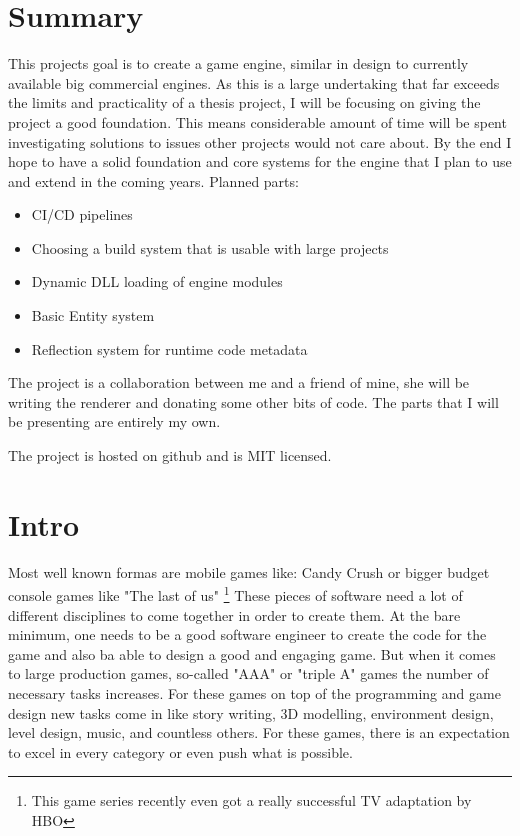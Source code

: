 \chapter{Summary}

This projects goal is to create a game engine, similar in design to currently available big commercial engines.
As this is a large undertaking that far exceeds the limits and practicality of a thesis project, I will be focusing on giving the project a good foundation. This means considerable amount of time will be spent investigating solutions to issues other projects would not care about. By the end I hope to have a solid foundation and core systems for the engine that I plan to use and extend in the coming years.
Planned parts:

\begin{itemize}
    \item CI/CD pipelines
    \item Choosing a build system that is usable with large projects
    \item Dynamic DLL loading of engine modules
    \item Basic Entity system
    \item Reflection system for runtime code metadata
\end{itemize}

The project is a collaboration between me and a friend of mine, she will be writing the renderer and donating some other bits of code. The parts that I will be presenting are entirely my own.

The project is hosted on github and is MIT licensed.


\chapter{Intro}

Most well known formas are mobile games like: Candy Crush or bigger budget console games like "The last of us" \footnote{This game series recently even got a really successful TV adaptation by HBO}
These pieces of software need a lot of different disciplines to come together in order to create them. At the bare minimum, one needs to be a good software engineer to create the code for the game and also ba able to design a good and engaging game. But when it comes to large production games, so-called "AAA" or "triple A" games the number of necessary tasks increases. For these games on top of the programming and game design new tasks come in like story writing, 3D modelling, environment design, level design, music, and countless others. For these games, there is an expectation to excel in every category or even push what is possible.

